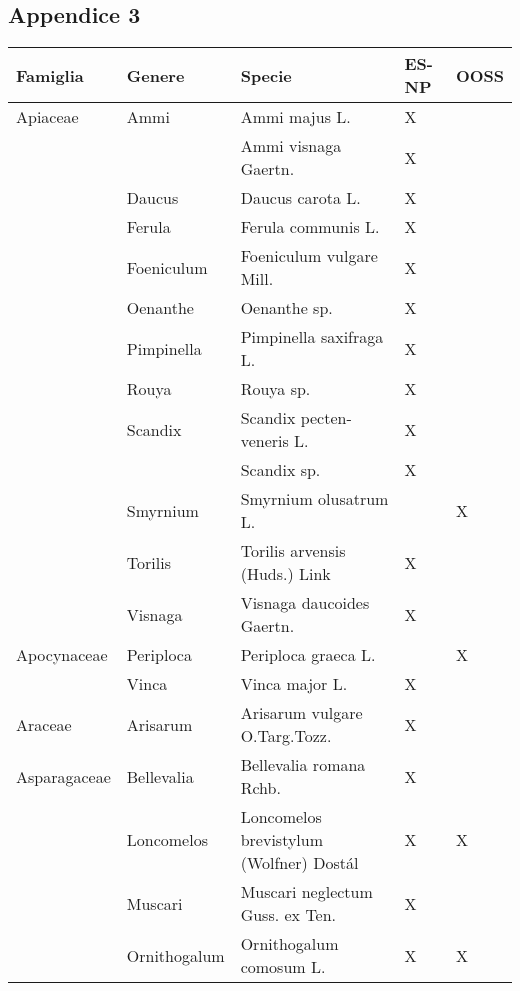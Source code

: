 \documentclass[main.tex]{subfiles}
\begin{document}
\subsection{Appendice 3}

\begin{table}[!ht]
    \centering
    \begin{tabular}[\footnotesize]{|p{2.4cm}|p{1.9cm}|p{5.8cm}|p{1.1cm}|p{1cm}|}
    \hline
        \textbf{Famiglia} & \textbf{Genere} & \textbf{Specie} & \textbf{ES-NP} & \textbf{OOSS} \\ \hline
        Apiaceae & Ammi & Ammi majus L. & X & ~ \\ \hline
        ~ & ~ & Ammi visnaga Gaertn. & X & ~ \\ \hline
        ~ & Daucus & Daucus carota L. & X & ~ \\ \hline
        ~ & Ferula & Ferula communis L. & X & ~ \\ \hline
        ~ & Foeniculum & Foeniculum vulgare Mill. & X & ~ \\ \hline
        ~ & Oenanthe & Oenanthe sp. & X & ~ \\ \hline
        ~ & Pimpinella & Pimpinella saxifraga L. & X & ~ \\ \hline
        ~ & Rouya & Rouya sp. & X & ~ \\ \hline
        ~ & Scandix & Scandix pecten-veneris L. & X & ~ \\ \hline
        ~ & ~ & Scandix sp.  & X & ~ \\ \hline
        ~ & Smyrnium & Smyrnium olusatrum L. & ~ & X \\ \hline
        ~ & Torilis & Torilis arvensis (Huds.) Link & X & ~ \\ \hline
        ~ & Visnaga & Visnaga daucoides Gaertn. & X & ~ \\ \hline
        Apocynaceae & Periploca & Periploca graeca L. & ~ & X \\ \hline
        ~ & Vinca & Vinca major L. & X & ~ \\ \hline
        Araceae & Arisarum & Arisarum vulgare O.Targ.Tozz. & X & ~ \\ \hline
        Asparagaceae & Bellevalia & Bellevalia romana Rchb. & X & ~ \\ \hline
        ~ & Loncomelos & Loncomelos brevistylum (Wolfner) Dostál & X & X \\ \hline
        ~ & Muscari & Muscari neglectum Guss. ex Ten. & X & ~ \\ \hline
        ~ & Ornithogalum & Ornithogalum comosum L. & X & X \\ \hline

\end{tabular}
\end{table}
\end{document}
